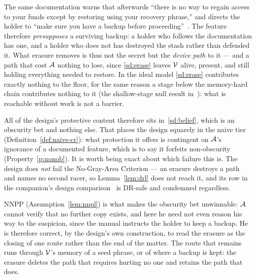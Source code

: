 The same documentation warns that afterwards ``there is no way to regain access
to your funds except by restoring using your recovery phrase,'' and directs the
holder to ``make sure you have a backup before
proceeding''~\cite{jade-erase-pin}. The feature therefore \emph{presupposes} a
surviving backup: a holder who follows the documentation has one, and a holder
who does not has destroyed the stash rather than defended it. What
erasure removes is thus not the secret but the \emph{device path} to it --- and a
path that cost $\mathcal{A}$ nothing to lose, since \ref{sd:erase} leaves
$\mathcal{V}$ alive, present, and still holding everything needed to restore. In the
ideal model \ref{sd:erase} contributes exactly nothing to the floor, for the same
reason a stage below the memory-hard chain contributes nothing to it
(the shallow-stage null result in~\cite{deadly-race}): what is reachable without work is not a barrier.

All of the design's protective content therefore sits in~\ref{sd:belief}, which
is an obscurity bet and nothing else. That places the design squarely in the
naive tier (Definition~\ref{def:naive-cr}): what protection it offers is
contingent on $\mathcal{A}$'s ignorance of a documented feature, which is to say it
forfeits non-obscurity (Property~\ref{p:nonob}). It is worth being exact about
which failure this is. The design does \emph{not} fail the No-Gray-Area
Criterion --- an erasure destroys a path and names no second racer, so
Lemma~\ref{lem:drl} does not reach it, and its row in the companion's design
comparison~\cite[\S5]{deadly-race} is DR-safe
and condemned regardless.

NNPP (Assumption~\ref{lem:nnpl}) is what makes the obscurity bet unwinnable:
$\mathcal{A}$ cannot verify that no further copy exists, and here he need not even
reason his way to the suspicion, since the manual instructs the holder to keep a
backup. He is therefore correct, by the design's own construction, to read the
erasure as the closing of one route rather than the end of the matter. The route
that remains runs through $\mathcal{V}$'s memory of a seed phrase, or of where a
backup is kept: the erasure deletes the path that requires hurting no one and
retains the path that does.

